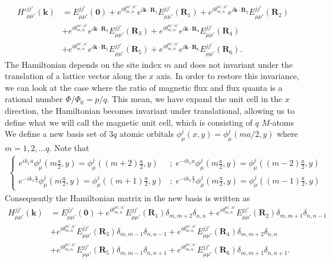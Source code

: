 \documentclass{report}
\begin{document}
\begin{equation}
	\begin{aligned}
		{H'}_{\mu\mu'}^{jj'}(\mathbf{k})
		&= E_{\mu\mu'}^{jj'}(\mathbf{0}) + e^{i\theta_{m,n}^{m',n'} }e^{i \mathbf{k} \cdot \mathbf{R}_{1}} E_{\mu\mu'}^{jj'}(\mathbf{R}_{1}) + e^{i\theta_{m,n}^{m',n'} } e^{i \mathbf{k} \cdot \mathbf{R}_{2}} E_{\mu\mu'}^{jj'}(\mathbf{R}_{2})\\
		&+ e^{i\theta_{m,n}^{m',n'} } e^{i \mathbf{k} \cdot \mathbf{R}_{3}} E_{\mu\mu'}^{jj'}(\mathbf{R}_{3}) + e^{i\theta_{m,n}^{m',n'} }e^{i \mathbf{k} \cdot \mathbf{R}_{4}} E_{\mu\mu'}^{jj'}(\mathbf{R}_{4})\\
		&+ e^{i\theta_{m,n}^{m',n'} } e^{i \mathbf{k} \cdot \mathbf{R}_{5}} E_{\mu\mu'}^{jj'}(\mathbf{R}_{5}) + e^{i\theta_{m,n}^{m',n'} }e^{i \mathbf{k} \cdot \mathbf{R}_{6}} E_{\mu\mu'}^{jj'}(\mathbf{R}_{6}).
	\end{aligned}
\end{equation}
The Hamiltonian depends on the site index $m$ and does not invariant under the translation of a lattice vector along the $x$ axis. In order to restore this invariance, we can look at the case where the ratio of magnetic flux and flux quanta is a rational number $\Phi / \Phi_{0} = p / q$. This mean, we have expand the unit cell in the $x$ direction, the Hamiltonian becomes invariant under translational, allowing us to define what we will call the magnetic unit cell, which is consisting of $q$ $M$-atoms %
We define a new basis set of $3q$ atomic orbitals $\phi_{\mu}^{j} (x,y) = \phi_{\mu}^{j} (ma/2,y)$ where $m = 1,2,...q$. Note that
\begin{gather}
	\begin{cases}
		e^{i k_{x} a} \phi_{\mu}^{j} \left(m \frac{a}{2},y\right) = \phi_{\mu}^{j} \left((m+2)\frac{a}{2},y\right) &;\;  e^{-i k_{x} a} \phi_{\mu}^{j} \left(m\frac{a}{2},y\right) = \phi_{\mu}^{j} \left((m-2)\frac{a}{2},y\right)\\
		e^{-i k_{x} \frac{a}{2}} \phi_{\mu}^{j} \left(m \frac{a}{2},y\right) = \phi_{\mu}^{j} \left((m+1)\frac{a}{2},y\right) &;\;  e^{-i k_{x} \frac{a}{2}} \phi_{\mu}^{j} \left(m\frac{a}{2},y\right) = \phi_{\mu}^{j} \left((m-1)\frac{a}{2},y\right)
	\end{cases}
\end{gather}
Consequently the Hamiltonian matrix in the new basis is written as 
\begin{equation}
	\begin{aligned}
		H_{\mu\mu'}^{jj'}(\mathbf{k})
		& = E_{\mu\mu'}^{jj'}(\mathbf{0}) + e^{i\theta_{m,n}^{m',n'}} E_{\mu\mu'}^{jj'}(\mathbf{R}_{1}) \delta_{m,m+2}\delta_{n,n} + e^{i\theta_{m,n}^{m',n'}} E_{\mu\mu'}^{jj'}(\mathbf{R}_{2}) \delta_{m,m+1} \delta_{n,n - 1}\\
		& + e^{i\theta_{m,n}^{m',n'}} E_{\mu\mu'}^{jj'}(\mathbf{R}_{3}) \delta_{m,m - 1} \delta_{n,n - 1} + e^{i\theta_{m,n}^{m',n'}} E_{\mu\mu'}^{jj'}(\mathbf{R}_{4}) \delta_{m,m + 2} \delta_{n,n}\\
		& + e^{i\theta_{m,n}^{m',n'}} E_{\mu\mu'}^{jj'}(\mathbf{R}_{5}) \delta_{m,m - 1} \delta_{n,n + 1} + e^{i\theta_{m,n}^{m',n'}} E_{\mu\mu'}^{jj'}(\mathbf{R}_{6}) \delta_{m,m + 1} \delta_{n,n + 1}.
	\end{aligned}
\end{equation}
\end{document}
